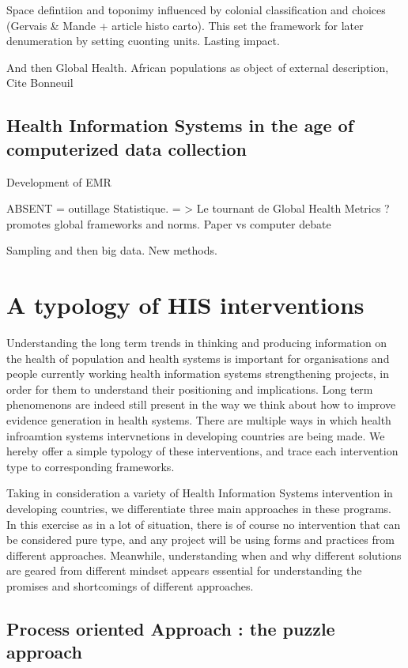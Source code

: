 \documentclass[letterpaper, 10 pt, conference]{ieeeconf}  %
\begin{document}
Space defintiion and toponimy influenced by colonial classification and choices (Gervais \& Mande + article histo carto). This set the framework for later denumeration by setting cuonting units. Lasting impact.

And then Global Health. African populations as object of external description, Cite Bonneuil

\subsection{Health Information Systems in the age of computerized data collection}

Development of EMR

ABSENT = outillage Statistique. = > Le tournant de Global Health Metrics ? \cite{health_metrics_network_framework_2008} promotes global frameworks and norms.
Paper vs computer debate

Sampling and then big data. New methods.


\section{A typology of HIS interventions}

Understanding the long term trends in thinking and producing information on the health of population and health systems is important for organisations and people currently working health information systems strengthening projects, in order for them to understand their positioning and implications. Long term phenomenons are indeed still present in the way we think about how to improve evidence generation in health systems. There are multiple ways in which health infroamtion systems intervnetions in developing countries are being made. We hereby offer a simple typology of these interventions, and trace each intervention type to corresponding frameworks.

Taking in consideration a variety of Health Information Systems intervention in developing countries, we differentiate three main approaches in these programs. In this exercise as in a lot of situation, there is of course no intervention that can be considered pure type, and any project will be using forms and practices from different approaches. Meanwhile, understanding when and why different solutions are geared from different mindset appears essential for understanding the promises and shortcomings of different approaches.

\subsection{Process oriented Approach : the puzzle approach}
\end{document}
